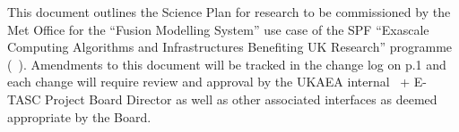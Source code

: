 This document outlines the Science Plan for research to be commissioned 
by the Met Office for the ``Fusion Modelling System'' use case of the SPF ``Exascale 
Computing Algorithms and Infrastructures Benefiting UK Research'' programme (\exc \  ). 
Amendments to this document will be tracked in the change log 
on p.1 and each change will require review and approval by the UKAEA internal \exc \   
+ E-TASC Project Board Director as well as other associated interfaces 
as deemed appropriate by the Board.
